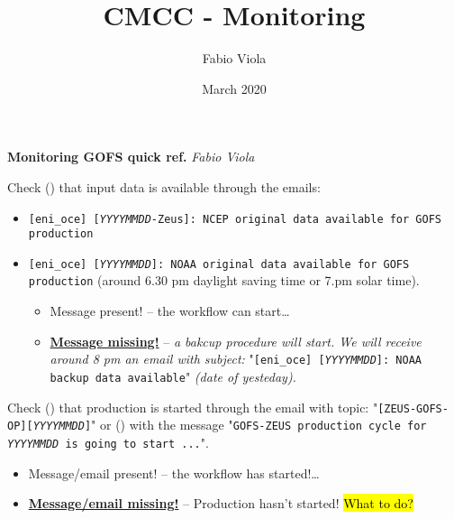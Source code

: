 \documentclass[twocolumn,8pt]{article}
\title{CMCC - Monitoring}
\author{Fabio Viola}
\date{March 2020}
\begin{document}
\LARGE \textbf{Monitoring GOFS quick ref.}  \hfill \textit{\small Fabio Viola}\normalsize


\begin{mdframed}[frametitle=(A.0)\ -- At 8 pm\hfill\faMoonO]

Check (\faEnvelope) that input data is available through the emails:
\begin{itemize}\itemsep0pt
    \item \texttt{[eni\_oce] [\textit{YYYYMMDD}-Zeus]: NCEP original data available for GOFS production}
    \item \texttt{[eni\_oce] [\textit{YYYYMMDD}]: NOAA original data available for GOFS production} (around 6.30 pm daylight saving time or 7.pm solar time). 
    \begin{itemize}\itemsep0pt
        \item[{\textcolor{ForestGreen}{\faCheckCircle}}] Message present! -- the workflow can start\dots
        \item[{\textcolor{Red}{\faTimesCircle}}] \ul{\textbf{Message missing!}} -- \textit{a bakcup procedure will start. We will receive around 8 pm an email with subject:} "\texttt{[eni\_oce] [\textit{YYYYMMDD}]: NOAA backup data available}" \textit{(date of yesteday).}
    \end{itemize}
\end{itemize}
\end{mdframed}

\begin{mdframed}[frametitle=(A.1)\ -- At 8.30 pm\hfill\faMoonO]

Check (\faEnvelope) that production is started through the email with topic: "\texttt{[ZEUS-GOFS-OP][\textit{YYYYMMDD}]}" or (\faSend) with the message "\texttt{GOFS-ZEUS production cycle for \textit{YYYYMMDD} is going to start ...}".
    \begin{itemize}\itemsep0pt
        \item[{\textcolor{ForestGreen}{\faCheckCircle}}] Message/email present! -- the workflow has started!\dots
        \item[{\textcolor{Red}{\faTimesCircle}}] \ul{\textbf{Message/email missing!}} -- Production hasn't started! \hl{What to do?}
    \end{itemize}
\end{mdframed}
\end{document}
